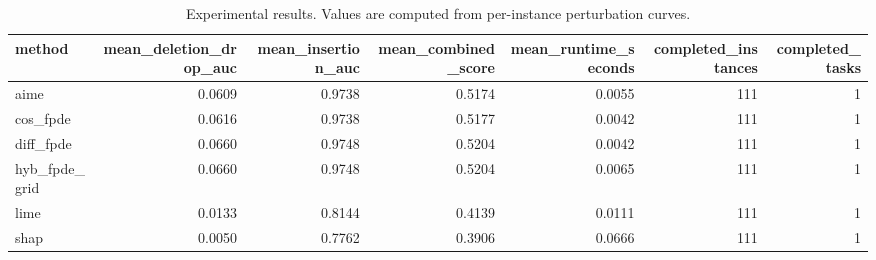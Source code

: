 \begin{table}[t]
\caption{Experimental results. Values are computed from per-instance perturbation curves.}
\label{tab:main_results_computed}
\centering
\begin{tabular}{lrrrrrr}
\toprule
method & mean\_deletion\_drop\_auc & mean\_insertion\_auc & mean\_combined\_score & mean\_runtime\_seconds & completed\_instances & completed\_tasks \\
\midrule
aime & 0.0609 & 0.9738 & 0.5174 & 0.0055 & 111 & 1 \\
cos\_fpde & 0.0616 & 0.9738 & 0.5177 & 0.0042 & 111 & 1 \\
diff\_fpde & 0.0660 & 0.9748 & 0.5204 & 0.0042 & 111 & 1 \\
hyb\_fpde\_grid & 0.0660 & 0.9748 & 0.5204 & 0.0065 & 111 & 1 \\
lime & 0.0133 & 0.8144 & 0.4139 & 0.0111 & 111 & 1 \\
shap & 0.0050 & 0.7762 & 0.3906 & 0.0666 & 111 & 1 \\
\bottomrule
\end{tabular}

\end{table}
